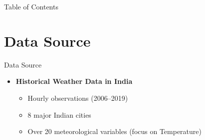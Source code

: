 \documentclass[svgnames, 12pt]{beamer}
\begin{document}
\begin{frame}{Table of Contents}
\tableofcontents
\end{frame}

\section{Data Source}

\begin{frame}{Data Source}
			\begin{itemize}
		\item \textbf{Historical Weather Data in India}
		\begin{itemize}
			\item Hourly observations (2006--2019)
			\item 8 major Indian cities
			\item Over 20 meteorological variables (focus on Temperature)
		\end{itemize}
			\end{itemize}
\end{frame}
\end{document}
